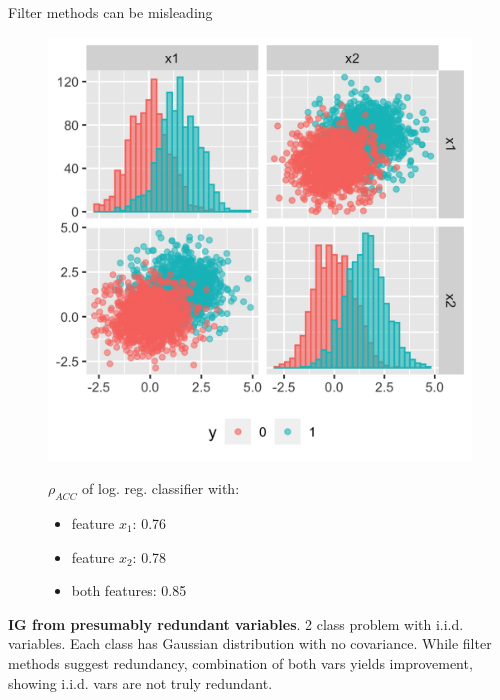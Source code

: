 \documentclass[11pt,compress,t,notes=noshow, xcolor=table]{beamer}
\begin{document}
  \begin{vbframe}{Filter methods can be misleading}

   \begin{figure}
    \centering
    \begin{minipage}{0.45\textwidth}
        \centering
        \includegraphics[width=\textwidth]{figure/guyon_example_presumably_redundant.png} %
    \end{minipage}\hfill
    \begin{minipage}{0.45\textwidth}
        $\rho_{ACC}$ of log. reg. classifier with:
        \begin{itemize}
        \item{feature $x_1$: 0.76}
        \item{feature $x_2$: 0.78}
        \item{both features: 0.85}
        \end{itemize}
    \end{minipage}
    \end{figure}
\vspace{0.3cm}
\footnotesize{\textbf{IG from presumably redundant variables}. 2 class problem with i.i.d. variables. Each class has Gaussian distribution with no covariance. While filter methods suggest redundancy, combination of both vars yields improvement, showing i.i.d. vars are not truly redundant. %
}
\end{vbframe}
\end{document}
